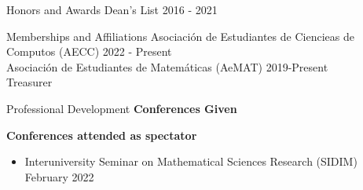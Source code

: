 \documentclass{resume} %
\begin{document}
\begin{rSection}{Honors and Awards}
    Dean's List \hfill{2016 - 2021}
\end{rSection}

\begin{rSection}{Memberships and Affiliations}
    Asociaci\'on de Estudiantes de Ciencieas de Computos (AECC) \hfill{2022 - Present} \\
    Asociaci\'on de Estudiantes de Matem\'aticas (AeMAT) \hfill{2019-Present} \\
    \hspace*{17mm} Treasurer
\end{rSection}


\begin{rSection}{Professional Development}
    \textbf{Conferences Given}
    \textbf{Conferences attended as spectator}
    \begin{itemize}
        \item Interuniversity Seminar on Mathematical Sciences Research (SIDIM)
        \hfill{February 2022}
    \end{itemize}

\end{rSection}
\end{document}
